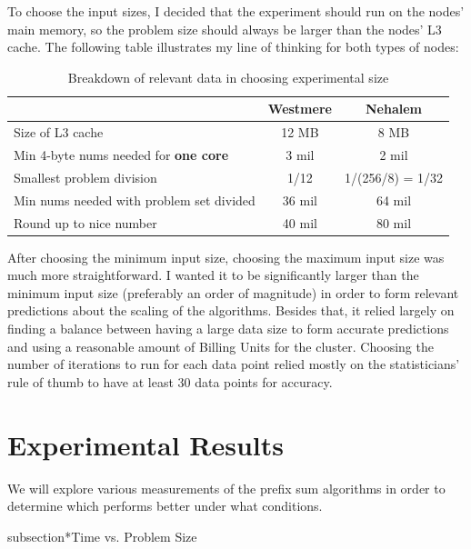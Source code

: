 \documentclass{article}
\begin{document}
To choose the input sizes, I decided that the experiment should run on the nodes' main memory, so the problem size should always be larger than the nodes' L3 cache.  The following table illustrates my line of thinking for both types of nodes:

\begin{table}%
\centering
\begin{tabular}{|l|c|c|}

\multicolumn{1}{c|}{} & Westmere & Nehalem \\
\hline
Size of L3 cache          & 12 MB    & 8 MB \\
\hline
Min 4-byte nums 
needed for 
\textbf{one core}         & 3 mil    & 2 mil \\
\hline
Smallest problem division & 1/12     & 1/(256/8) = 1/32 \\
\hline
Min nums needed
with problem set
divided										& 36 mil   & 64 mil \\
\hline
Round up to nice number   & 40 mil	 & 80 mil \\
\hline

\end{tabular}
\caption{Breakdown of relevant data in choosing experimental size}
\label{}
\end{table}

After choosing the minimum input size, choosing the maximum input size was much more straightforward.  I wanted it to be significantly larger than the minimum input size (preferably an order of magnitude) in order to form relevant predictions about the scaling of the algorithms.  Besides that, it relied largely on finding a balance between having a large data size to form accurate predictions and using a reasonable amount of Billing Units for the cluster.  Choosing the number of iterations to run for each data point relied mostly on the statisticians' rule of thumb to have at least 30 data points for accuracy.

\section{Experimental Results}

We will explore various measurements of the prefix sum algorithms in order to determine which performs better under what conditions.

subsection*{Time vs. Problem Size}
\end{document}

